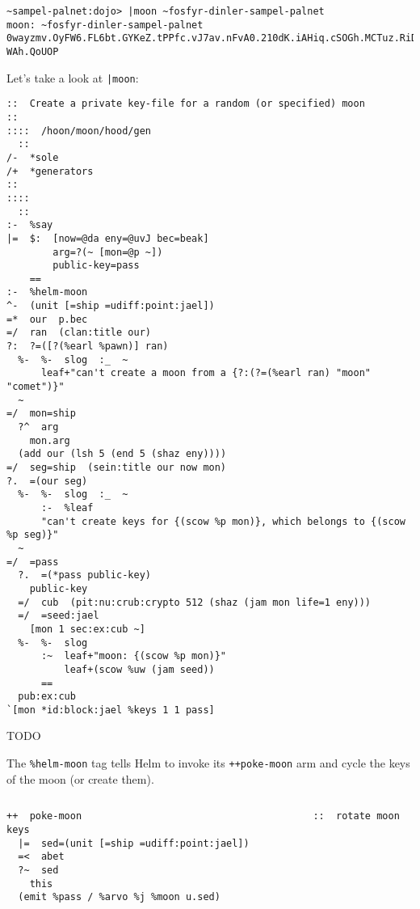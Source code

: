\begin{lstlisting}
~sampel-palnet:dojo> |moon ~fosfyr-dinler-sampel-palnet
moon: ~fosfyr-dinler-sampel-palnet
0wayzmv.OyFW6.FL6bt.GYKeZ.tPPfc.vJ7av.nFvA0.210dK.iAHiq.cSOGh.MCTuz.RiDIV.A3Pd8.pPZcV.djykA.kzrxV.P6M0s.~oZge.Nsjpr.K-WAh.QoUOP
\end{lstlisting}

Let's take a look at \texttt{|moon}:

\begin{lstlisting}[caption={\texttt{gen/hood/moon.hoon}, 🄯Tlon}]
::  Create a private key-file for a random (or specified) moon
::
::::  /hoon/moon/hood/gen
  ::
/-  *sole
/+  *generators
::
::::
  ::
:-  %say
|=  $:  [now=@da eny=@uvJ bec=beak]
        arg=?(~ [mon=@p ~])
        public-key=pass
    ==
:-  %helm-moon
^-  (unit [=ship =udiff:point:jael])
=*  our  p.bec
=/  ran  (clan:title our)
?:  ?=([?(%earl %pawn)] ran)
  %-  %-  slog  :_  ~
      leaf+"can't create a moon from a {?:(?=(%earl ran) "moon" "comet")}"
  ~
=/  mon=ship
  ?^  arg
    mon.arg
  (add our (lsh 5 (end 5 (shaz eny))))
=/  seg=ship  (sein:title our now mon)
?.  =(our seg)
  %-  %-  slog  :_  ~
      :-  %leaf
      "can't create keys for {(scow %p mon)}, which belongs to {(scow %p seg)}"
  ~
=/  =pass
  ?.  =(*pass public-key)
    public-key
  =/  cub  (pit:nu:crub:crypto 512 (shaz (jam mon life=1 eny)))
  =/  =seed:jael
    [mon 1 sec:ex:cub ~]
  %-  %-  slog
      :~  leaf+"moon: {(scow %p mon)}"
          leaf+(scow %uw (jam seed))
      ==
  pub:ex:cub
`[mon *id:block:jael %keys 1 1 pass]
\end{lstlisting}

TODO

The \texttt{\%helm-moon} tag tells Helm to invoke its \texttt{++poke-moon} arm and cycle the keys of the moon (or create them).

\begin{lstlisting}[style=nonumbers,
                   caption={\texttt{lib/hood/helm.hoon}, line 211}]
%helm-moon             =;(f (f !<(_+<.f vase)) poke-moon)
\end{lstlisting}

\begin{lstlisting}[style=nonumbers,
                   caption={\texttt{lib/hood/helm.hoon}, lines 75–80}]
++  poke-moon                                        ::  rotate moon keys
  |=  sed=(unit [=ship =udiff:point:jael])
  =<  abet
  ?~  sed
    this
  (emit %pass / %arvo %j %moon u.sed)
\end{lstlisting}

